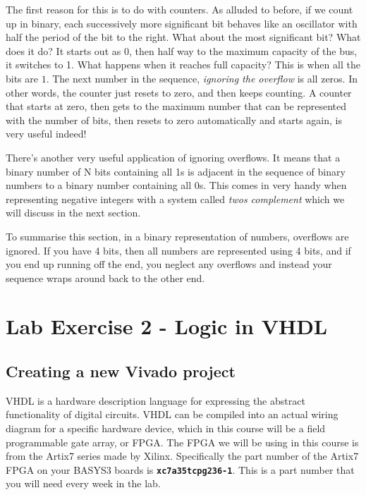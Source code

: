 \documentclass[../physical_computing.tex]{subfiles}
\begin{document}
The first reason for this is to do with counters. As alluded to before, if we count up in binary, each successively more significant bit behaves like an oscillator with half the period of the bit to the right. What about the most significant bit? What does it do? It starts out as 0, then half way to the maximum capacity of the bus, it switches to 1. What happens when it reaches full capacity? This is when all the bits are $1$. The next number in the sequence, {\it ignoring the overflow} is all zeros. In other words, the counter just resets to zero, and then keeps counting. A counter that starts at zero, then gets to the maximum number that can be represented with the number of bits, then resets to zero automatically and starts again, is very useful indeed!

There's another very useful application of ignoring overflows. It means that a binary number of N bits containing all 1s is adjacent in the sequence of binary numbers to a binary number containing all 0s. This comes in very handy when representing negative integers with a system called {\it twos complement} which we will discuss in the next section.

To summarise this section, in a binary representation of numbers, overflows are ignored. If you have 4 bits, then all numbers are represented using 4 bits, and if you end up running off the end, you neglect any overflows and instead your sequence wraps around back to the other end.

\section{Lab Exercise 2 - Logic in VHDL}
\label{sec:appendix_2}

\subsection{Creating a new Vivado project}
\label{sec:create_new_vivado_project}

VHDL is a hardware description language for expressing the abstract functionality of digital circuits. VHDL can be compiled into an actual wiring diagram for a specific hardware device, which in this course will be a field programmable gate array, or FPGA. The FPGA we will be using in this course is from the Artix7 series made by Xilinx. Specifically the part number of the Artix7 FPGA on your BASYS3 boards is \texttt{\bf xc7a35tcpg236-1}. This is a part number that you will need every week in the lab. 
\end{document}
